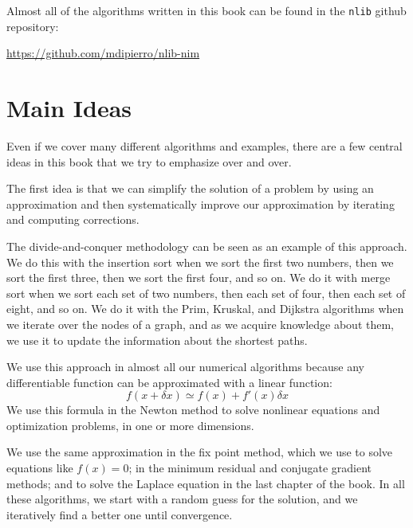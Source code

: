 \documentclass[justified, sixbynine]{tufte-book}
\def\ft{\small\tt}
\theoremstyle{plain}%
\newtheorem * {corollary}{Corollary}
\theoremstyle{definition}
\theoremstyle{remark}
\newtheorem * {remark}{Remark}
\newtheorem * {note}{Note}
\begin{document}
\begin{fullwidth}
Almost all of the algorithms written in this book can be found in the {\ft nlib} github repository:

\url{https://github.com/mdipierro/nlib-nim}

\section{Main Ideas}

Even if we cover many different algorithms and examples, there are a few central ideas in this book that we try to emphasize over and over.

The first idea is that we can simplify the solution of a problem by using an approximation and then systematically improve our approximation by iterating and computing corrections.

The divide-and-conquer methodology can be seen as an example of this approach. We do this with the insertion sort when we sort the first two numbers, then we sort the first three, then we sort the first four, and so on. We do it with merge sort when we sort each set of two numbers, then each set of four, then each set of eight, and so on. We do it with the Prim, Kruskal, and Dijkstra algorithms when we iterate over the nodes of a graph, and as we acquire knowledge about them, we use it to update the information about the shortest paths.

We use this approach in almost all our numerical algorithms because any differentiable function can be approximated with a linear function:
\begin{equation}
f(x+\delta x) \simeq f(x) + f'(x)\delta x
\end{equation}
We use this formula in the Newton method to solve nonlinear equations and optimization problems, in one or more dimensions.

We use the same approximation in the fix point method, which we use to solve equations like $f(x)=0$; in the minimum residual and conjugate gradient methods; and to solve the Laplace equation in the last chapter of the book. In all these algorithms, we start with a random guess for the solution, and we iteratively find a better one until convergence.


\end{fullwidth}
\end{document}
